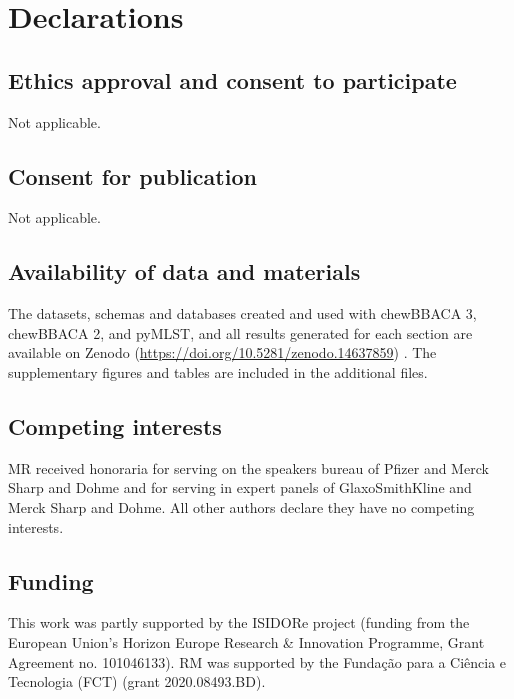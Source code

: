 \section{Declarations} \label{sec:declarations}

\subsection{Ethics approval and consent to participate} \label{ssec:declarations_ssec1}

\noindent Not applicable.

\subsection{Consent for publication} \label{ssec:declarations_ssec2}

\noindent Not applicable.

\subsection{Availability of data and materials} \label{ssec:declarations_ssec3}

The datasets, schemas and databases created and used with chewBBACA 3, chewBBACA 2, and pyMLST, and all results generated for each section are available on Zenodo (\url{https://doi.org/10.5281/zenodo.14637859}) \citep{mamede_supplementary_2025}. The supplementary figures and tables are included in the additional files.

\subsection{Competing interests} \label{ssec:declarations_ssec4}

MR received honoraria for serving on the speakers bureau of Pfizer and Merck Sharp and Dohme and for serving in expert panels of GlaxoSmithKline and Merck Sharp and Dohme. All other authors declare they have no competing interests.

\subsection{Funding} \label{ssec:declarations_ssec5}

This work was partly supported by the ISIDORe project (funding from the European Union’s Horizon Europe Research \& Innovation Programme, Grant Agreement no. 101046133). RM was supported by the Fundação para a Ciência e Tecnologia (FCT) (grant 2020.08493.BD).

